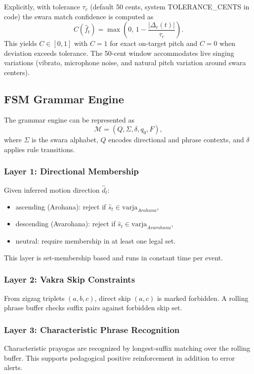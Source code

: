 \documentclass{ieeeaccess}
\begin{document}
Explicitly, with tolerance $\tau_c$ (default 50 cents, system TOLERANCE_CENTS in code) the swara match confidence is computed as
\begin{equation}
C(\hat{f}_t)=\max\left(0,\,1-\frac{|\Delta_c(t)|}{\tau_c}\right).
\end{equation}
This yields $C\in[0,1]$ with $C=1$ for exact on-target pitch and $C=0$ when deviation exceeds tolerance. The 50-cent window accommodates live singing variations (vibrato, microphone noise, and natural pitch variation around swara centers).

\subsection{FSM Grammar Engine}
The grammar engine can be represented as
\begin{equation}
\mathcal{M}=(Q,\Sigma,\delta,q_0,F),
\end{equation}
where $\Sigma$ is the swara alphabet, $Q$ encodes directional and phrase contexts, and $\delta$ applies rule transitions.

\subsubsection{Layer 1: Directional Membership}
Given inferred motion direction $\hat{d}_t$:
\begin{itemize}
\item ascending (Arohana): reject if $\hat{s}_t\in\mathrm{varja}_{Arohana}$,
\item descending (Avarohana): reject if $\hat{s}_t\in\mathrm{varja}_{Avarohana}$,
\item neutral: require membership in at least one legal set.
\end{itemize}
This layer is set-membership based and runs in constant time per event.

\subsubsection{Layer 2: Vakra Skip Constraints}
From zigzag triplets $(a,b,c)$, direct skip $(a,c)$ is marked forbidden. A rolling phrase buffer checks suffix pairs against forbidden skip set.

\subsubsection{Layer 3: Characteristic Phrase Recognition}
Characteristic prayogas are recognized by longest-suffix matching over the rolling buffer. This supports pedagogical positive reinforcement in addition to error alerts.
\end{document}
